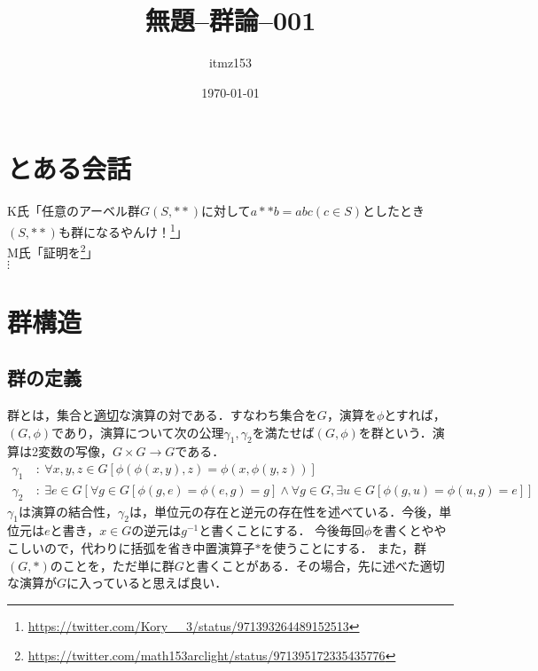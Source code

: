 \documentclass[dvipdfmx,12pt]{jsarticle}
\title{無題--群論--001}
\author{itmz153}
\date{\today}
\begin{document}
\maketitle
\section*{とある会話}
K氏「任意のアーベル群$G(S, **)$に対して$a ** b = abc (c∈S)$としたとき$(S, **)$も群になるやんけ！\footnote{\url{https://twitter.com/Kory__3/status/971393264489152513}}」 \\

M氏「証明を\footnote{\url{https://twitter.com/math153arclight/status/971395172335435776}}」 \\

$\vdots$
\section*{群構造}
\subsection*{群の定義}
群とは，集合と\underline{適切}な演算の対である．すなわち集合を$G$，演算を$\phi$とすれば，$(G,\phi)$であり，演算について次の公理$\gamma_1 , \gamma_2$を満たせば$(G,\phi)$を群という．演算は2変数の写像，$G \times G \to G$である．
\begin{align*}
\gamma_1\ &:\ \forall x,y,z \in G[\phi(\phi(x,y),z) = \phi(x,\phi(y,z))] \\
\gamma_2\ &: \ \exists e \in G [\forall g \in G[\phi(g,e) = \phi(e,g) = g] \land \forall g \in G , \exists u \in G[\phi(g,u) = \phi(u,g) = e]]
\end{align*}
$\gamma_1$は演算の結合性，$\gamma_2$は，単位元の存在と逆元の存在性を述べている．今後，単位元は$e$と書き，$x \in G$の逆元は$g^{-1}$と書くことにする．
今後毎回$\phi$を書くとややこしいので，代わりに括弧を省き中置演算子$*$を使うことにする．
また，群$(G,*)$のことを，ただ単に群$G$と書くことがある．その場合，先に述べた適切な演算が$G$に入っていると思えば良い．
\end{document}
